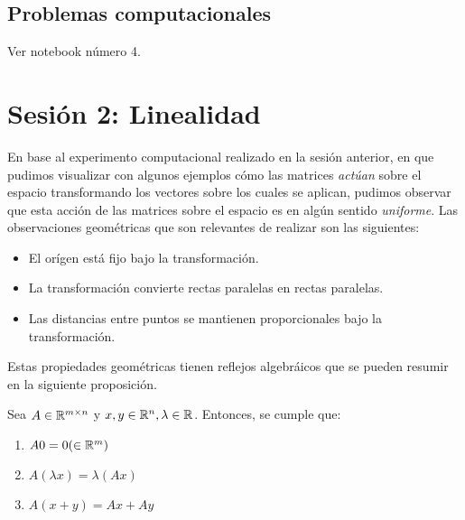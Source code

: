 \subsection{Problemas computacionales}

Ver notebook número 4.

\section{Sesión 2: Linealidad} En base al experimento computacional realizado en la sesión anterior, en que pudimos visualizar con algunos ejemplos cómo las matrices \textit{actúan} sobre el espacio transformando los vectores sobre los cuales se aplican, pudimos observar que esta acción de las matrices sobre el espacio es en algún sentido \textit{uniforme}. Las observaciones geométricas que son relevantes de realizar son las siguientes:

\begin{itemize}
    \item El orígen está fijo bajo la transformación.
    \item La transformación convierte rectas paralelas en rectas paralelas.
    \item Las distancias entre puntos se mantienen proporcionales bajo la transformación.
\end{itemize}

Estas propiedades geométricas tienen reflejos algebráicos que se pueden resumir en la siguiente proposición.

\begin{proposition}
    Sea $A \in \mathbb{R}^{m \times n}$ y $x, y \in \mathbb{R}^n, \lambda \in \mathbb{R}$. Entonces, se cumple que:
    \begin{enumerate}
        \item $A 0 = 0 (\in \mathbb{R}^m)$
        \item $A(\lambda x) = \lambda(Ax)$
        \item $A(x + y) = Ax + Ay$
    \end{enumerate}
\end{proposition}

